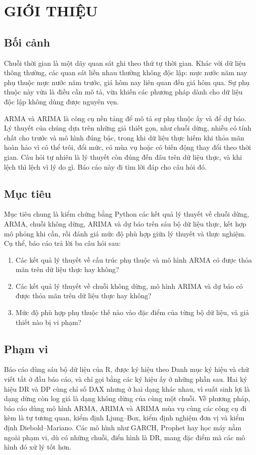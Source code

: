 \clearpage
\section[Giới thiệu]{GIỚI THIỆU}

\subsection{Bối cảnh}
Chuỗi thời gian là một dãy quan sát ghi theo thứ tự thời gian. Khác với dữ liệu thông thường, các quan sát liền nhau thường không độc lập: mực nước năm nay phụ thuộc mực nước năm trước, giá hôm nay liên quan đến giá hôm qua. Sự phụ thuộc này vừa là điều cần mô tả, vừa khiến các phương pháp dành cho dữ liệu độc lập không dùng được nguyên vẹn.

ARMA và ARIMA là công cụ nền tảng để mô tả sự phụ thuộc ấy và để dự báo. Lý thuyết của chúng dựa trên những giả thiết gọn, như chuỗi dừng, nhiễu có tính chất cho trước và mô hình đúng bậc, trong khi dữ liệu thực hiếm khi thỏa mãn hoàn hảo vì có thể trôi, đổi mức, có mùa vụ hoặc có biến động thay đổi theo thời gian. Câu hỏi tự nhiên là lý thuyết còn đúng đến đâu trên dữ liệu thực, và khi lệch thì lệch vì lý do gì. Báo cáo này đi tìm lời đáp cho câu hỏi đó.

\subsection{Mục tiêu}
Mục tiêu chung là kiểm chứng bằng Python các kết quả lý thuyết về chuỗi dừng, ARMA, chuỗi không dừng, ARIMA và dự báo trên sáu bộ dữ liệu thực, kết hợp mô phỏng khi cần, rồi đánh giá mức độ phù hợp giữa lý thuyết và thực nghiệm. Cụ thể, báo cáo trả lời ba câu hỏi sau:
\begin{enumerate}[label=\textbf{CH\arabic*.}]
	\item Các kết quả lý thuyết về cấu trúc phụ thuộc và mô hình ARMA có được thỏa mãn trên dữ liệu thực hay không?
	\item Các kết quả lý thuyết về chuỗi không dừng, mô hình ARIMA và dự báo có được thỏa mãn trên dữ liệu thực hay không?
	\item Mức độ phù hợp phụ thuộc thế nào vào đặc điểm của từng bộ dữ liệu, và giả thiết nào bị vi phạm?
\end{enumerate}

\subsection{Phạm vi}
Báo cáo dùng sáu bộ dữ liệu của R, được ký hiệu theo Danh mục ký hiệu và chữ viết tắt ở đầu báo cáo, và chỉ gọi bằng các ký hiệu ấy ở những phần sau. Hai ký hiệu DR và DP cùng chỉ số DAX nhưng ở hai dạng khác nhau, vì suất sinh lợi là dạng dừng còn log giá là dạng không dừng của cùng một chuỗi.
Về phương pháp, báo cáo dùng mô hình ARMA, ARIMA và ARIMA mùa vụ cùng các công cụ đi kèm là tự tương quan, kiểm định Ljung--Box, kiểm định nghiệm đơn vị và kiểm định Diebold--Mariano. Các mô hình như GARCH, Prophet hay học máy nằm ngoài phạm vi, dù có những chuỗi, điển hình là DR, mang đặc điểm mà các mô hình đó xử lý tốt hơn.

